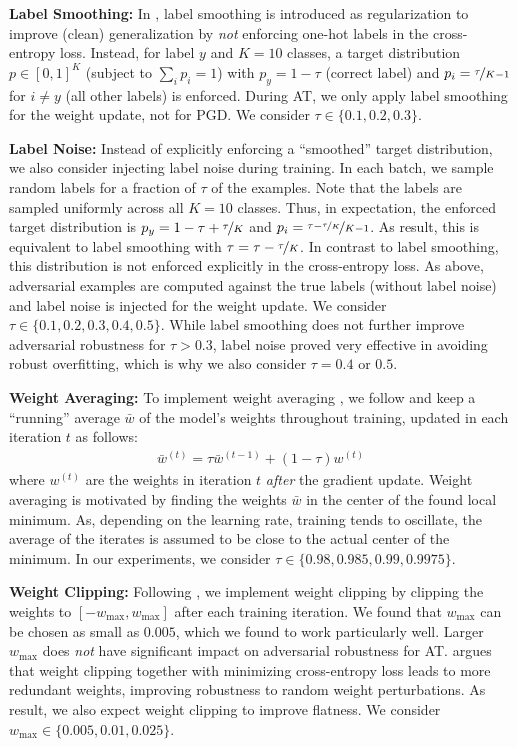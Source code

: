 \textbf{Label Smoothing:}
%
In \cite{SzegedyCVPR2016}, label smoothing is introduced as regularization to improve (clean) generalization by \emph{not} enforcing one-hot labels in the cross-entropy loss. Instead, for label $y$ and $K = 10$ classes, a target distribution $p \in [0,1]^K$ (subject to $\sum_i p_i = 1$) with $p_y = 1 - \tau$ (correct label) and $p_i = \nicefrac{\tau}{K - 1}$ for $i \neq y$ (all other labels) is enforced. During AT, we only apply label smoothing for the weight update, not for PGD. We consider $\tau \in \{0.1, 0.2, 0.3\}$.

\textbf{Label Noise:}
%
Instead of explicitly enforcing a ``smoothed'' target distribution, we also consider injecting label noise during training. In each batch, we sample random labels for a fraction of $\tau$ of the examples. Note that the labels are sampled uniformly across all $K = 10$ classes. Thus, in expectation, the enforced target distribution is $p_y = 1 - \tau + \nicefrac{\tau}{K}$ and $p_i = \nicefrac{\tau - \nicefrac{\tau}{K}}{K - 1}$. As result, this is equivalent to label smoothing with $\tau = \tau - \nicefrac{\tau}{K}$. In contrast to label smoothing, this distribution is not enforced explicitly in the cross-entropy loss. As above, adversarial examples are computed against the true labels (without label noise) and label noise is injected for the weight update. We consider $\tau \in \{0.1, 0.2, 0.3, 0.4, 0.5\}$. While label smoothing does not further improve adversarial robustness for $\tau > 0.3$, label noise proved very effective in avoiding robust overfitting, which is why we also consider $\tau = 0.4$ or $0.5$.

\textbf{Weight Averaging:}
%
To implement weight averaging \cite{IzmailovUAI2018}, we follow \cite{GowalARXIV2020} and keep a ``running'' average $\bar{w}$ of the model's weights throughout training, updated in each iteration $t$ as follows: 
\begin{align}
	\bar{w}^{(t)} = \tau \bar{w}^{(t - 1)} + (1 - \tau) w^{(t)}
\end{align}
where $w^{(t)}$ are the weights in iteration $t$ \emph{after} the gradient update. Weight averaging is motivated by finding the weights $\bar{w}$ in the center of the found local minimum. As, depending on the learning rate, training tends to oscillate, the average of the iterates is assumed to be close to the actual center of the minimum. In our experiments, we consider $\tau \in \{0.98, 0.985, 0.99, 0.9975\}$.

\textbf{Weight Clipping:}
%
Following \cite{StutzMLSYS2021}, we implement weight clipping by clipping the weights to $[-w_{\text{max}}, w_{\text{max}}]$ after each training iteration. We found that $w_{\text{max}}$ can be chosen as small as $0.005$, which we found to work particularly well. Larger $w_{\text{max}}$ does \emph{not} have significant impact on adversarial robustness for AT. \cite{StutzMLSYS2021} argues that weight clipping together with minimizing cross-entropy loss leads to more redundant weights, improving robustness to random weight perturbations. As result, we also expect weight clipping to improve flatness. We consider $w_{\text{max}} \in \{0.005, 0.01, 0.025\}$.

